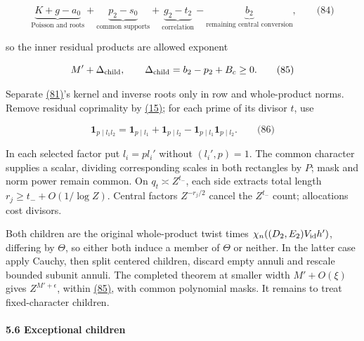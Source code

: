 \hypertarget{cf:eq:D.20}{}

\label{cf:eq:D.20}

\[
\underbrace{K+g-a_0}_{\text{Poisson and roots}}
+\underbrace{p_2-s_0}_{\text{common supports}}
+\underbrace{g_2-t_2}_{\text{correlation}}
-\underbrace{b_2}_{\text{remaining central conversion}},
\qquad\text{(84)}
\]

so the inner residual products are allowed exponent

\hypertarget{cf:eq:D.21}{}

\label{cf:eq:D.21}

\[
M'+\Delta_{\rm child},\qquad \Delta_{\rm child}=b_2-p_2+B_c\ge0.
\qquad\text{(85)}
\]

Separate \protect\hyperlink{cf:eq:D.17}{(81)}'s kernel and inverse roots only in row and whole-product norms. Remove residual coprimality by \protect\hyperlink{cf:eq:A.19}{(15)}; for each prime of its divisor \(t\), use

\hypertarget{cf:eq:D.22}{}

\label{cf:eq:D.22}

\[
\mathbf1_{p\mid l_1l_2}=\mathbf1_{p\mid l_1}+\mathbf1_{p\mid l_2}
-\mathbf1_{p\mid l_1}\mathbf1_{p\mid l_2}.
\qquad\text{(86)}
\]

In each selected factor put \(l_i=pl_i'\) without \((l_i',p)=1\). The common character supplies a scalar, dividing corresponding scales in both rectangles by \(P\); mask and norm power remain common. On \(q_t\asymp Z^{t_-}\), each side extracts total length \(r_j\ge t_-+O(1/\log Z)\). Central factors \(Z^{-r_j/2}\) cancel the \(Z^{t_-}\) count; allocations cost divisors.

Both children are the original whole-product twist times \(\chi_n((D_2,E_2)V_{\rm id}h')\), differing by \(\Theta\), so either both induce a member of \(\Theta\) or neither. In the latter case apply Cauchy, then split centered children, discard empty annuli and rescale bounded subunit annuli. The completed theorem at smaller width \(M'+O(\xi)\) gives \(Z^{M'+\epsilon}\), within \protect\hyperlink{cf:eq:D.21}{(85)}, with common polynomial masks. It remains to treat fixed-character children.

\hypertarget{cf:sec:D.6}{}

\label{cf:sec:D.6}

\hypertarget{exceptional-children}{%
\paragraph{5.6 Exceptional children}\label{exceptional-children}}

